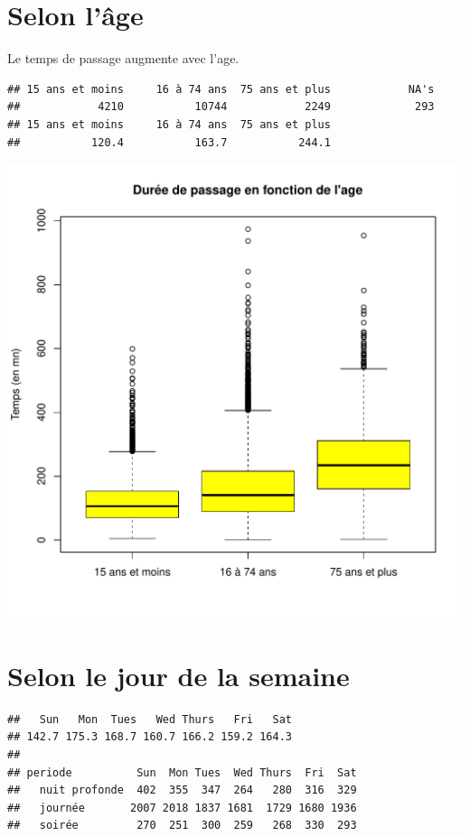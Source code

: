 \documentclass[12pt,english,french,twoside]{report}\usepackage[]{graphicx}\usepackage[]{color}
\makeatletter
\def\maxwidth{ %
  \ifdim\Gin@nat@width>\linewidth
    \linewidth
  \else
    \Gin@nat@width
  \fi
}
\newenvironment{kframe}{%
 \def\at@end@of@kframe{}%
 \ifinner\ifhmode%
  \def\at@end@of@kframe{\end{minipage}}%
  \begin{minipage}{\columnwidth}%
 \fi\fi%
 \def\FrameCommand##1{\hskip\@totalleftmargin \hskip-\fboxsep
 \colorbox{shadecolor}{##1}\hskip-\fboxsep
     \hskip-\linewidth \hskip-\@totalleftmargin \hskip\columnwidth}%
 \MakeFramed {\advance\hsize-\width
   \@totalleftmargin\z@ \linewidth\hsize
   \@setminipage}}%
 {\par\unskip\endMakeFramed%
 \at@end@of@kframe}
\newenvironment{knitrout}{}{} %
\makeatother
\begin{document}
\begin{knitrout}
\end{knitrout}



\section*{Selon l'âge}

Le temps de passage augmente avec l'age.
\begin{knitrout}
\color{fgcolor}\begin{kframe}
\begin{verbatim}
## 15 ans et moins     16 à 74 ans  75 ans et plus            NA's 
##            4210           10744            2249             293
## 15 ans et moins     16 à 74 ans  75 ans et plus 
##           120.4           163.7           244.1
\end{verbatim}
\end{kframe}
\includegraphics[width=\maxwidth]{figure/duree_age} 

\end{knitrout}


\section*{Selon le jour de la semaine}
\begin{knitrout}
\color{fgcolor}\begin{kframe}
\begin{verbatim}
##   Sun   Mon  Tues   Wed Thurs   Fri   Sat 
## 142.7 175.3 168.7 160.7 166.2 159.2 164.3
##                
## periode          Sun  Mon Tues  Wed Thurs  Fri  Sat
##   nuit profonde  402  355  347  264   280  316  329
##   journée       2007 2018 1837 1681  1729 1680 1936
##   soirée         270  251  300  259   268  330  293
\end{verbatim}
\end{kframe}
\end{knitrout}
\end{document}
